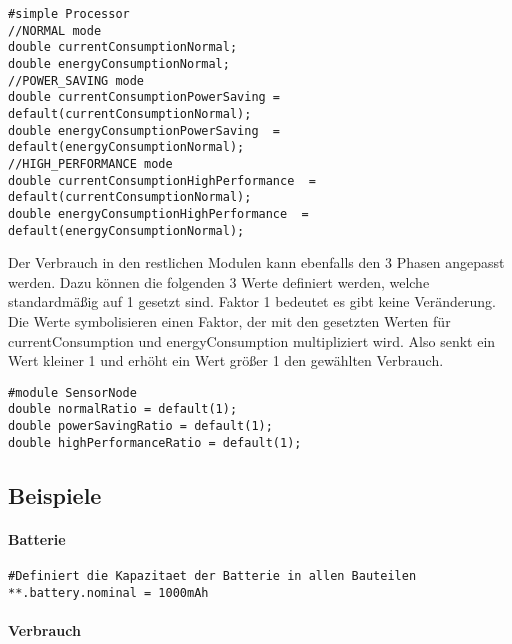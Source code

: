 \begin{minipage}{\textwidth}
\begin{lstlisting}
#simple Processor
//NORMAL mode
double currentConsumptionNormal;
double energyConsumptionNormal;
//POWER_SAVING mode
double currentConsumptionPowerSaving = default(currentConsumptionNormal);
double energyConsumptionPowerSaving  = default(energyConsumptionNormal);
//HIGH_PERFORMANCE mode
double currentConsumptionHighPerformance  = default(currentConsumptionNormal);
double energyConsumptionHighPerformance  = default(energyConsumptionNormal);
\end{lstlisting}
\end{minipage}

Der Verbrauch in den restlichen Modulen kann ebenfalls den 3 Phasen angepasst werden. Dazu können die folgenden 3 Werte definiert werden, welche standardmäßig auf 1 gesetzt sind. Faktor 1 bedeutet es gibt keine Veränderung. Die Werte symbolisieren einen Faktor, der mit den gesetzten Werten für currentConsumption und energyConsumption multipliziert wird. Also senkt ein Wert kleiner 1 und erhöht ein Wert größer 1 den gewählten Verbrauch.

\begin{minipage}{\textwidth}
\begin{lstlisting}
#module SensorNode
double normalRatio = default(1);
double powerSavingRatio = default(1);
double highPerformanceRatio = default(1);
\end{lstlisting}
\end{minipage}

\subsection*{Beispiele}

\paragraph{Batterie}

\begin{minipage}{\textwidth}
\begin{lstlisting}
#Definiert die Kapazitaet der Batterie in allen Bauteilen
**.battery.nominal = 1000mAh
\end{lstlisting}
\end{minipage}

\paragraph{Verbrauch}

